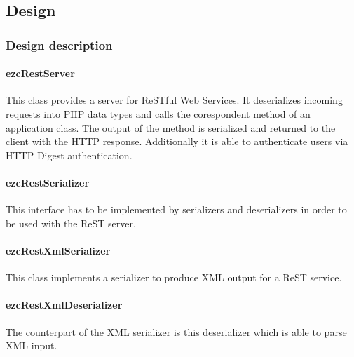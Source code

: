 \documentclass[10pt,final,a4paper,oneside]{article}
\begin{document}

\subsection{Design}\label{subsec:ReSTDesign}
%
%

\subsubsection{Design description}
\paragraph{ezcRestServer}
This class provides a server for ReSTful Web Services.
It deserializes incoming requests into PHP data types
and calls the corespondent method of an application class.
The output of the method is serialized
and returned to the client with the HTTP response.
Additionally it is able to authenticate users
via HTTP Digest authentication.


\paragraph{ezcRestSerializer}
This interface has to be implemented by serializers
and deserializers in order to be used with the
ReST server.

\paragraph{ezcRestXmlSerializer}
This class implements a serializer
to produce XML output for a ReST service.

\paragraph{ezcRestXmlDeserializer}
The counterpart of the XML serializer is this
deserializer which is able to parse XML input.
\end{document}
